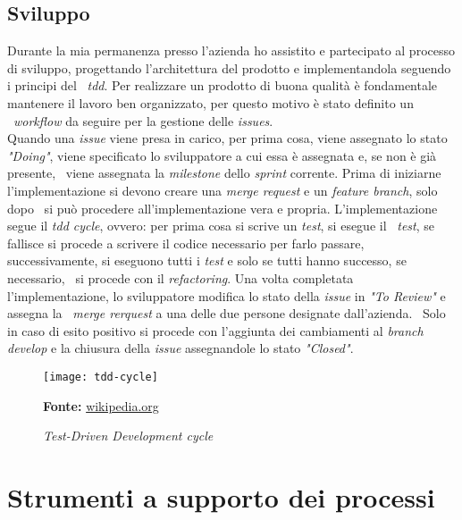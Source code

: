 \subsection{Sviluppo}
Durante la mia permanenza presso l'azienda ho assistito e partecipato al processo di sviluppo, progettando l'architettura del prodotto e implementandola seguendo i principi del \
\emph{\acrfull{tdd}}. Per realizzare un prodotto di buona qualità è fondamentale mantenere il lavoro ben organizzato, per questo motivo è stato definito un \
\emph{workflow} da seguire per la gestione delle \emph{issues}. \\

Quando una \emph{issue} viene presa in carico, per prima cosa, viene assegnato lo stato \emph{"Doing"}, viene specificato lo sviluppatore a cui essa è assegnata e, se non è già presente, \
viene assegnata la \emph{milestone} dello \emph{sprint} corrente. Prima di iniziarne l'implementazione si devono creare una \emph{merge request} e un \emph{feature branch}, solo dopo \
si può procedere all'implementazione vera e propria. L'implementazione segue il \emph{\acrlong{tdd} cycle}, ovvero: per prima cosa si scrive un \emph{test}, si esegue il \
\emph{test}, se fallisce si procede a scrivere il codice necessario per farlo passare, successivamente, si eseguono tutti i \emph{test} e solo se tutti hanno successo, se necessario, \
si procede con il \emph{refactoring}. Una volta completata l'implementazione, lo sviluppatore modifica lo stato della \emph{issue} in \emph{"To Review"} e assegna la \
\emph{merge rerquest} a una delle due persone designate dall'azienda. \
Solo in caso di esito positivo si procede con l'aggiunta dei cambiamenti al \emph{branch develop} e la chiusura della \emph{issue} assegnandole lo stato \emph{"Closed"}.

\begin{figure}[!ht]
  \begin{center}
    \texttt{[image: tdd-cycle]}
    \caption{\emph{Test-Driven Development cycle}}
    \textbf{Fonte:} \href{https://www.wikipedia.org}{wikipedia.org}
  \end{center}
\end{figure}

\section{Strumenti a supporto dei processi}

